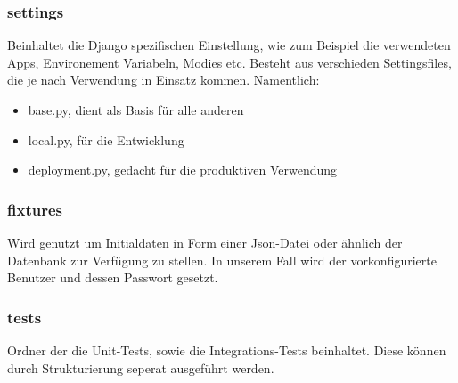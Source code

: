 \subsubsection{settings}
Beinhaltet die Django spezifischen Einstellung, wie zum Beispiel die verwendeten Apps, Environement Variabeln, Modies etc. Besteht aus verschieden Settingsfiles, die je nach Verwendung in Einsatz kommen. Namentlich:
\begin{itemize}
    \item base.py, dient als Basis für alle anderen
    \item local.py, für die Entwicklung
    \item deployment.py, gedacht für die produktiven Verwendung 
\end{itemize}

\subsubsection{fixtures}
Wird genutzt um Initialdaten in Form einer Json-Datei oder ähnlich der Datenbank zur Verfügung zu stellen. In unserem Fall wird der vorkonfigurierte Benutzer und dessen Passwort gesetzt.

\subsubsection{tests}
Ordner der die Unit-Tests, sowie die Integrations-Tests beinhaltet. Diese können durch Strukturierung seperat ausgeführt werden.
\newpage